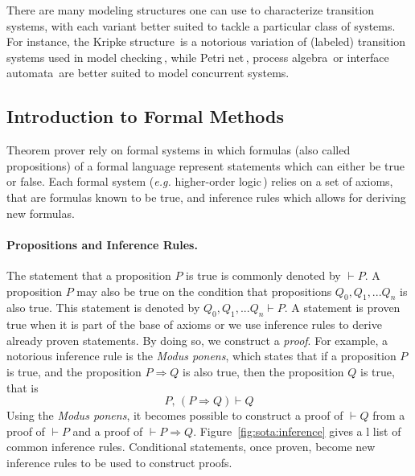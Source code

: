 There are many modeling structures one can use to characterize transition
systems, with each variant better suited to tackle a particular class of
systems.
%
For instance, the Kripke structure\,\cite{kripke1971semantical} is a notorious
variation of (labeled) transition systems used in model
checking\,\cite{clarke1999model}, while Petri net\,\cite{peterson1981petri},
process algebra\,\cite{bergstra1984process} or interface
automata\,\cite{de2001interface} are better suited to model concurrent systems.

\subsection{Introduction to Formal Methods}

Theorem prover rely on formal systems in which formulas (also called
propositions) of a formal language represent statements which can either be true
or false.
%
Each formal system (\emph{e.g.} higher-order logic\,\cite{leivant1994hol})
relies on a set of axioms, that are formulas known to be true, and inference
rules which allows for deriving new formulas.

\paragraph{Propositions and Inference Rules.}
%
The statement that a proposition \( P \) is true is commonly denoted by
\( \vdash P \).
%
A proposition \( P \) may also be true on the condition that propositions
\( Q_0, Q_1, ... Q_n \) is also true.
%
This statement is denoted by \( Q_0, Q_1, ... Q_n \vdash P \).
%
A statement is proven true when it is part of the base of axioms or we use
inference rules to derive already proven statements.
%
By doing so, we construct a \emph{proof}.
%
For example, a notorious inference rule is the \emph{Modus ponens}, which states
that if a proposition \( P \) is true, and the proposition \( P \Rightarrow Q \)
is also true, then the proposition \( Q \) is true, that is
%
\[
  P\text{, }(P \Rightarrow Q) \vdash Q
\]
%
Using the \emph{Modus ponens}, it becomes possible to construct a proof of
\( \vdash Q \) from a proof of \( \vdash P \) and a proof of
\( \vdash P \Rightarrow Q \).
%
Figure~\ref{fig:sota:inference} gives a l list of common inference rules.
%
Conditional statements, once proven, become new inference rules to be used to
construct proofs.

